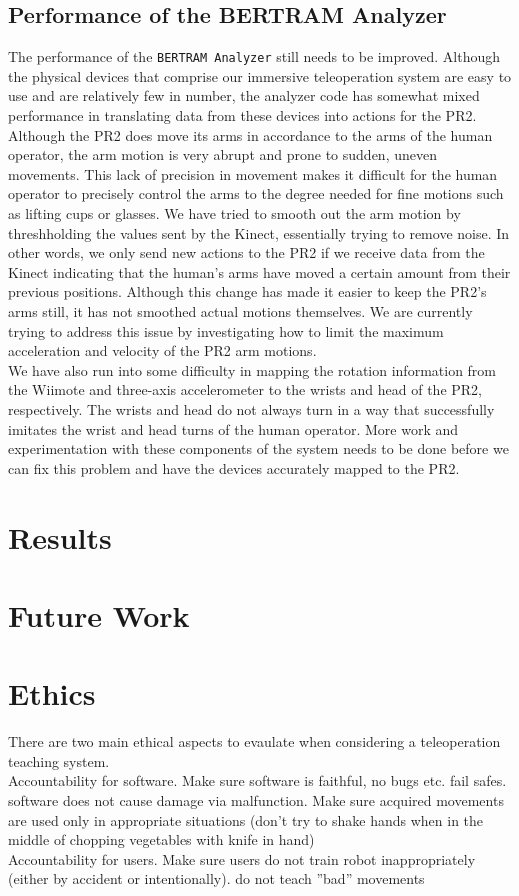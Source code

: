 \documentclass{sig-alternate}
\begin{document}
\subsection {Performance of the BERTRAM Analyzer}
\indent The performance of the {\tt BERTRAM Analyzer} still needs to be improved. Although the physical devices that comprise our immersive teleoperation system are easy to use and are relatively few in number, the analyzer code has somewhat mixed performance in translating data from these devices into actions for the PR2. Although the PR2 does move its arms in accordance to the arms of the human operator, the arm motion is very abrupt and prone to sudden, uneven movements. This lack of precision in movement makes it difficult for the human operator to precisely control the arms to the degree needed for fine motions such as lifting cups or glasses. We have tried to smooth out the arm motion by threshholding the values sent by the Kinect, essentially trying to remove noise. In other words, we only send new actions to the PR2 if we receive data from the Kinect indicating that the human's arms have moved a certain amount from their previous positions. Although this change has made it easier to keep the PR2's arms still, it has not smoothed actual motions themselves. We are currently trying to address this issue by investigating how to limit the maximum acceleration and velocity of the PR2 arm motions.\\
\indent We have also run into some difficulty in mapping the rotation information from the Wiimote and three-axis accelerometer to the wrists and head of the PR2, respectively. The wrists and head do not always turn in a way that successfully imitates the wrist and head turns of the human operator. More work and experimentation with these components of the system needs to be done before we can fix this problem and have the devices accurately mapped to the PR2.

\section{Results}
\label{sec:results}

\section{Future Work}
\label{sec:future_work}

\section{Ethics}
\label{sec:ethics}There are two main ethical aspects to evaulate when
considering a teleoperation teaching system.\\
\indent Accountability for software.
Make sure software is faithful, no bugs etc. fail safes. software
does not cause damage via malfunction. Make sure acquired movements are
used only in appropriate situations (don't try to shake hands when 
in the middle of chopping vegetables with knife in hand)\\
\indent Accountability for users. Make sure users do not train robot 
inappropriately (either by accident or intentionally). do not teach
''bad'' movements
\end{document}
